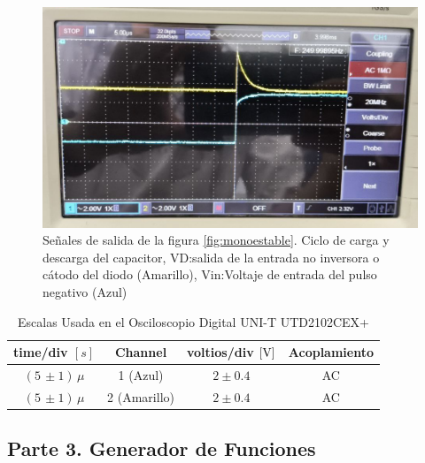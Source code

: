             
            \begin{figure}[H]
                \centering
                \renewcommand{\figurename}{Imagen}
                \includegraphics[width=15cm]{Imagenes/exp_monoestable_vcat_vin.png}
                \caption{Señales de salida de la figura \ref{fig:monoestable}. Ciclo de carga y descarga del capacitor,  VD:salida de la entrada no inversora o cátodo del diodo (Amarillo), Vin:Voltaje de entrada del pulso negativo (Azul)}
                \label{fig:exp_monoestable_vcat_vin}
            \end{figure}

            \begin{table}[H]
                \centering
                \begin{tabular}{|c|c|c|c|}
                    \hline
                    \textbf{time/div} $[s]$ & \textbf{Channel} & \textbf{voltios/div $[\volt]$} & \textbf{Acoplamiento} \\ \hline
                    $(5 \, \pm 1) \, \mu  $ & 1 (Azul)  &   $2 \pm 0.4   $ & AC \\ \hline  
                    $(5 \, \pm 1) \, \mu  $ & 2 (Amarillo)  &   $2 \pm 0.4   $ & AC \\ \hline  
                \end{tabular}
                \caption{Escalas Usada en el Osciloscopio Digital UNI-T UTD2102CEX+}
                \label{tab:escala_monoestable_vcat_vin}
            \end{table}

            

            
            
    
    \subsection{Parte 3. Generador de Funciones}\label{subsec:parte3}

